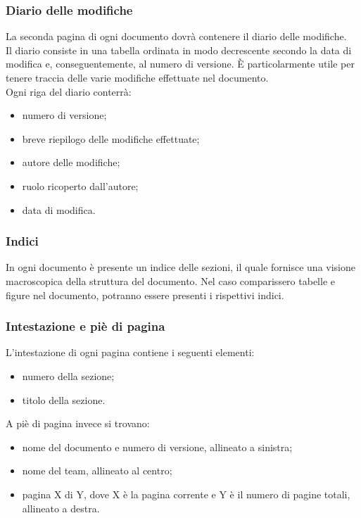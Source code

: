 		\subsubsection{Diario delle modifiche}
		La seconda pagina di ogni documento dovrà contenere il diario delle modifiche.\\
		Il diario consiste in una tabella ordinata in modo decrescente secondo la data di modifica e, conseguentemente, al numero di versione. È particolarmente utile per tenere traccia delle varie modifiche effettuate nel documento. \\
		Ogni riga del diario conterrà:
		\begin{itemize}
			\item numero di versione;
			\item breve riepilogo delle modifiche effettuate;
			\item autore delle modifiche;
			\item ruolo ricoperto dall'autore;
			\item data di modifica.
		\end{itemize}		
		\subsubsection{Indici}
		In ogni documento è presente un indice delle sezioni, il quale fornisce una visione macroscopica della struttura del documento. Nel caso comparissero tabelle e figure nel documento, potranno essere presenti i rispettivi indici.
		\subsubsection{Intestazione e piè di pagina}
		L'intestazione di ogni pagina contiene i seguenti elementi:
		\begin{itemize}
			\item numero della sezione;
			\item titolo della sezione.
		\end{itemize}
		A piè di pagina invece si trovano:
		\begin{itemize}
			\item nome del documento e numero di versione, allineato a sinistra;
			\item nome del team, allineato al centro;
			\item pagina X di Y, dove X è la pagina corrente e Y è il numero di pagine totali, allineato a destra.
		\end{itemize}
	
